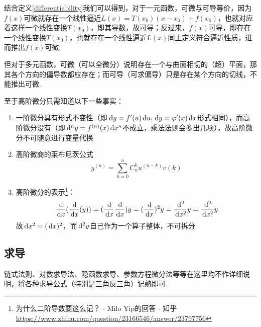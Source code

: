\par 结合定义\ref{differentiability}我们可以得到，对于一元函数，可微与可导等价，因为$f(x)$可微就存在一个线性逼近$L(x)=T(x_0)(x-x_0)+f(x_0)$，也就对应着这样一个线性变换$T(x_0)$，即其导数，故可导；反过来，$f(x)$可导，即存在一个线性变换$T(x_0)$，也就存在一个线性逼近$L(x)$同上定义符合逼近性质，进而推出$f(x)$可微.
\par 但对于多元函数，可微（可以全微分）说明存在一个与曲面相切的（超）平面，那其各个方向的偏导数都应存在；而可导（可求偏导）只是存在某个方向的切线，不能推出可微.
\par 至于高阶微分只需知道以下一些事实：
\begin{enumerate}
	\itemsep -3pt
	\item 一阶微分具有形式不变性（即$\,\mathrm{d} y=f'(u)\,\mathrm{d} u,\,\mathrm{d} y=\varphi'(x)\,\mathrm{d} x$形式相同），而高阶微分没有（即$\,\mathrm{d}^ny=f^{(n)}(x)\,\mathrm{d} x^n$不成立，乘法法则会多出几项），故高阶微分不可随意进行变量代换
	\item 高阶微商的莱布尼茨公式
	\[y^{(n)}=\sum_{k=0}^nC_n^ku^{(n-k)}v{(k)}\]
	\item 高阶微分的表示\footnote{为什么二阶导数要这么记？ - Milo Yip的回答 - 知乎 \url{https://www.zhihu.com/question/23166546/answer/23797756}}：
	\[\dfrac{\,\mathrm{d} }{\,\mathrm{d} x}(\dfrac{\,\mathrm{d} }{\,\mathrm{d} x}(y))=(\dfrac{\,\mathrm{d} }{\,\mathrm{d} x}\dfrac{\,\mathrm{d} }{\,\mathrm{d} x})y=(\dfrac{\,\mathrm{d} }{\,\mathrm{d} x})^2y=\dfrac{\,\mathrm{d}^2 }{\,\mathrm{d} x^2} y=\dfrac{\,\mathrm{d}^2 }{\,\mathrm{d} x^2}{y}\]
	故$\,\mathrm{d} x^2=(\,\mathrm{d} x)^2$，而$\,\mathrm{d}^2 y$自己作为一个算子整体，不可拆分
\end{enumerate}

\subsection{求导}
链式法则、对数求导法、隐函数求导、参数方程微分法等等在这里均不作详细说明，将各种求导公式（特别是三角反三角）记熟即可.

